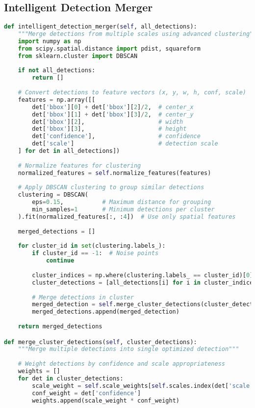 \documentclass[12pt,a4paper]{report}
\begin{document}
\subsection{Intelligent Detection Merger}
\begin{lstlisting}[language=Python, caption=Advanced Detection Merging Algorithm]
def intelligent_detection_merger(self, all_detections):
    """Merge detections from multiple scales using advanced clustering"""
    import numpy as np
    from scipy.spatial.distance import pdist, squareform
    from sklearn.cluster import DBSCAN
    
    if not all_detections:
        return []
    
    # Convert detections to feature vectors (x, y, w, h, conf, scale)
    features = np.array([[
        det['bbox'][0] + det['bbox'][2]/2,  # center_x
        det['bbox'][1] + det['bbox'][3]/2,  # center_y  
        det['bbox'][2],                     # width
        det['bbox'][3],                     # height
        det['confidence'],                  # confidence
        det['scale']                        # detection scale
    ] for det in all_detections])
    
    # Normalize features for clustering
    normalized_features = self.normalize_features(features)
    
    # Apply DBSCAN clustering to group similar detections
    clustering = DBSCAN(
        eps=0.15,           # Maximum distance for grouping
        min_samples=1       # Minimum detections per cluster
    ).fit(normalized_features[:, :4])  # Use only spatial features
    
    merged_detections = []
    
    for cluster_id in set(clustering.labels_):
        if cluster_id == -1:  # Noise points
            continue
            
        cluster_indices = np.where(clustering.labels_ == cluster_id)[0]
        cluster_detections = [all_detections[i] for i in cluster_indices]
        
        # Merge detections in cluster
        merged_detection = self.merge_cluster_detections(cluster_detections)
        merged_detections.append(merged_detection)
    
    return merged_detections

def merge_cluster_detections(self, cluster_detections):
    """Merge multiple detections into single optimized detection"""
    
    # Weight detections by confidence and scale appropriateness
    weights = []
    for det in cluster_detections:
        scale_weight = self.scale_weights[self.scales.index(det['scale'])]
        conf_weight = det['confidence']
        weights.append(scale_weight * conf_weight)
    

\end{lstlisting}
\end{document}
